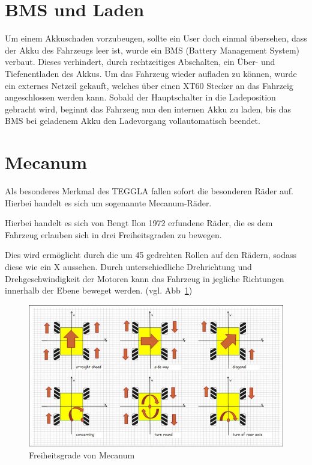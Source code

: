 \section{BMS und Laden}
Um einem Akkuschaden vorzubeugen, sollte ein User doch einmal übersehen, dass der Akku des Fahrzeugs leer ist, wurde ein BMS (Battery Management System) verbaut.
Dieses verhindert, durch rechtzeitiges Abschalten, ein Über- und Tiefenentladen des Akkus. 
Um das Fahrzeug wieder aufladen zu können, wurde ein externes Netzeil gekauft, welches über einen XT60 Stecker an das Fahrzeig angeschlossen werden kann.
Sobald der Hauptschalter in die Ladeposition gebracht wird, beginnt das Fahrzeug nun den internen Akku zu laden, bis das BMS bei geladenem Akku den Ladevorgang vollautomatisch beendet.

\section{Mecanum}
Als besonderes Merkmal des TEGGLA fallen sofort die besonderen Räder auf. Hierbei handelt es sich um sogenannte Mecanum-Räder. 

Hierbei handelt es sich von Bengt Ilon 1972 erfundene Räder, die es dem Fahrzeug erlauben sich in drei Freiheitsgraden zu bewegen.

Dies wird ermöglicht durch die um 45\degree{} gedrehten Rollen auf den Rädern, sodass diese wie ein X aussehen.
Durch unterschiedliche Drehrichtung und Drehgeschwindigkeit der Motoren kann das Fahrzeug in jegliche Richtungen innerhalb der Ebene beweget werden. (vgl. Abb~\ref{bild:mecanum})

\begin{figure}[!ht]
	\centering
	\includegraphics[width=\textwidth]{bilder/mecanum.jpg}
	\caption{Freiheitsgrade von Mecanum \cite{link:mecanum}}
	\label{bild:mecanum}
\end{figure}

